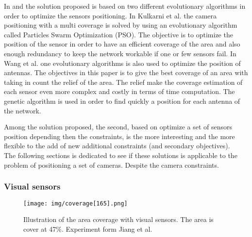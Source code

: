 \begin{itemize}
In \cite{59*wang2008} and \cite{200*kulkarni2011} the solution proposed is based on two different evolutionary algorithms in order to optimize the sensors positioning. 
In Kulkarni et al. \cite{200*kulkarni2011} the camera positioning with a multi coverage is solved by using an evolutionary algorithm called Particles Swarm Optimization (PSO). The objective is to optimize the position of the sensor in order to have an efficient coverage of the area and also enough redundancy to keep the network workable if one or few sensors fail. In Wang et al. \cite{59*wang2008} one evolutionary algorithms is also used to optimize the position of antennas. The objectives in this paper is to give the best coverage of an area with taking in count the relief of the area. The relief make the coverage estimation of each sensor even more complex and costly in terms of time computation. The genetic algorithm is used in order to find quickly a position for each antenna of the network. 
\end{itemize}

Among the solution proposed, the second, based on optimize a set of sensors position  depending then  the constraints, is the more interesting and the more flexible to the add of new additional constraints (and secondary objectives). \\
The following sections is dedicated to see if these solutions is applicable to the problem of positioning a set of cameras. Despite the camera constraints.

	\subsubsection{Visual sensors}
	
	\begin{figure}[t!]
	\center
{}
   \texttt{[image: img/coverage[165].png]}
  \caption{Illustration of  the  area coverage with visual sensors. The area  is cover at 47\%. Experiment form Jiang et al. \citep{165*jiang2010} }\label{fig:Coverage165}
  \endminipage\hfill
\end{figure}
	
